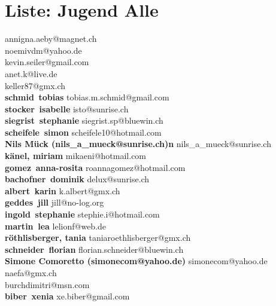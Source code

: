 \documentclass{scrartcl}
\begin{document}
\section*{Liste: Jugend Alle}
\textbf{} annigna.aeby@magnet.ch\\
\textbf{} noemivdm@yahoo.de\\
\textbf{} kevin.seiler@gmail.com\\
\textbf{} anet.k@live.de\\
\textbf{} keller87@gmx.ch\\
\textbf{schmid\, tobias } tobias.m.schmid@gmail.com\\
\textbf{stocker\, isabelle } isto@sunrise.ch\\
\textbf{siegrist\, stephanie } siegrist.sp@bluewin.ch\\
\textbf{scheifele\, simon } scheifele10@hotmail.com\\
\textbf{Nils Mück  (nils_a_mueck@sunrise.ch)n	  } nils_a_mueck@sunrise.ch\\
\textbf{känel, miriam  } mikaeni@hotmail.com\\
\textbf{gomez\, anna-rosita } roannagomez@hotmail.com\\
\textbf{bachofner\, dominik } delux@sunrise.ch\\
\textbf{albert\, karin } k.albert@gmx.ch\\
\textbf{geddes\, jill } jill@no-log.org\\
\textbf{ingold\, stephanie } stephie.i@hotmail.com\\
\textbf{martin\, lea } lelionf@web.de\\
\textbf{röthlisberger, tania  } taniaroethlisberger@gmx.ch\\
\textbf{schneider\, florian } florian.schneider@bluewin.ch\\
\textbf{Simone Comoretto (simonecom@yahoo.de) } simonecom@yahoo.de\\
\textbf{} naefa@gmx.ch\\
\textbf{} burchdimitri@msn.com\\
\textbf{biber\, xenia } xe.biber@gmail.com\\
\end{document}
